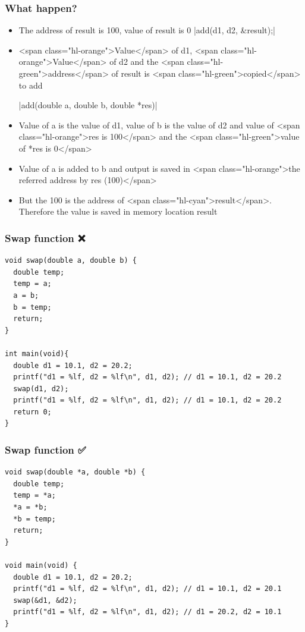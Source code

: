 \documentclass{../c-lecture}
\begin{document}
\begin{frame}[fragile]
  \frametitle{What happen?}
  \begin{itemize}
    |double result = 0;|
    \item The address of result is 100, value of result is 0
    |add(d1, d2, &result);|
    \item
      <span class="hl-orange">Value</span> of d1,
      <span class="hl-orange">Value</span> of d2 and the
      <span class="hl-green">address</span> of result is
      <span class="hl-green">copied</span> to add

    |add(double a, double b, double *res)|
    \item
      Value of a is the value of d1, value of b is the value of d2 and value
      of <span class="hl-orange">res is 100</span> and the
      <span class="hl-green">value of *res is 0</span>
  \end{itemize}
\end{frame}

\begin{frame}[fragile]
  \begin{itemize}
    |*res = a + b;|
    \item
      Value of a is added to b and output is saved in
      <span class="hl-orange">the referred address by res (100)</span>
    \item
      But the 100 is the address of <span class="hl-cyan">result</span>.
      Therefore the value is saved in memory location result
  \end{itemize}
\end{frame}

\begin{frame}[fragile]
  \frametitle{Swap function ❌}
  \begin{verbatim}
void swap(double a, double b) {
  double temp;
  temp = a;
  a = b;
  b = temp;
  return;
}

int main(void){
  double d1 = 10.1, d2 = 20.2;
  printf("d1 = %lf, d2 = %lf\n", d1, d2); // d1 = 10.1, d2 = 20.2
  swap(d1, d2);
  printf("d1 = %lf, d2 = %lf\n", d1, d2); // d1 = 10.1, d2 = 20.2
  return 0;
}
  \end{verbatim}
\end{frame}

\begin{frame}[fragile]
  \frametitle{Swap function ✅}
  \begin{verbatim}
void swap(double *a, double *b) {
  double temp;
  temp = *a;
  *a = *b;
  *b = temp;
  return;
}

void main(void) {
  double d1 = 10.1, d2 = 20.2;
  printf("d1 = %lf, d2 = %lf\n", d1, d2); // d1 = 10.1, d2 = 20.1
  swap(&d1, &d2);
  printf("d1 = %lf, d2 = %lf\n", d1, d2); // d1 = 20.2, d2 = 10.1
}
  \end{verbatim}
\end{frame}
\end{document}
